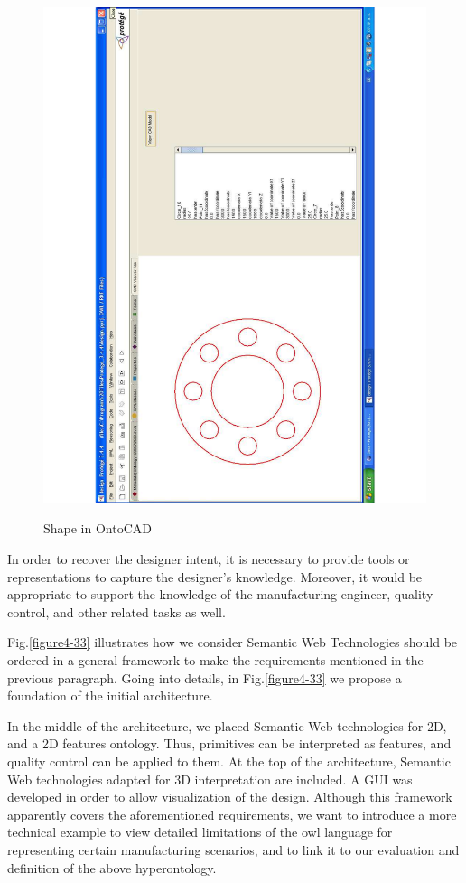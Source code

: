 \begin{figure}
\begin{center}
	\includegraphics[scale=0.5,angle=270]{figure-chapterIV/fig432}\\
	\caption{Shape in OntoCAD}
	\label{figure432}
\end{center}
\end{figure}


In order to recover the designer intent, it is necessary to provide tools or representations to capture the designer’s knowledge. Moreover, it would be appropriate to support the knowledge of the manufacturing engineer, quality control, and other related tasks as well. 

Fig.\ref{figure4-33} illustrates how we consider Semantic Web Technologies should be ordered in a general framework to make the requirements mentioned in the previous paragraph. Going into details, in Fig.\ref{figure4-33} we propose a foundation of the initial architecture.

In the middle of the architecture, we placed Semantic Web technologies for 2D, and a 2D features ontology. Thus, primitives can be interpreted as features, and quality control can be applied to them. At the top of the architecture, Semantic Web technologies adapted for 3D interpretation are included. A GUI was developed in order to allow visualization of the design. Although this framework apparently covers the aforementioned requirements, we want to introduce a more technical example to view detailed limitations of  the \gls{owl}  language for representing certain manufacturing scenarios, and to link it to our evaluation and definition of the above hyperontology.


